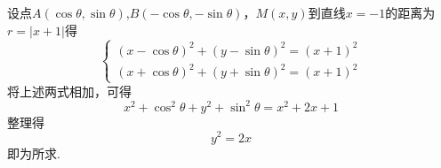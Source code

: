 设点$A\left( {\cos \theta ,\sin \theta } \right)$,$B\left( { - \cos \theta , - \sin \theta } \right)$，$M\left( {x,y} \right)$到直线$x =  - 1$的距离为$r = \left| {x + 1} \right|$得
\begin{equation}
\left\{ {\begin{array}{*{20}{c}}
{{{\left( {x - \cos \theta } \right)}^2} + {{\left( {y - \sin \theta } \right)}^2} = {{\left( {x + 1} \right)}^2}}\\
{{{\left( {x + \cos \theta } \right)}^2} + {{\left( {y + \sin \theta } \right)}^2} = {{\left( {x + 1} \right)}^2}}
\end{array}} \right.
\end{equation}
将上述两式相加，可得
\begin{equation}
{x^2} + {\cos ^2}\theta  + {y^2} + {\sin ^2}\theta  = {x^2} + 2x + 1
\end{equation}
整理得
\begin{equation}
{y^2} = 2x
\end{equation}
即为所求.
